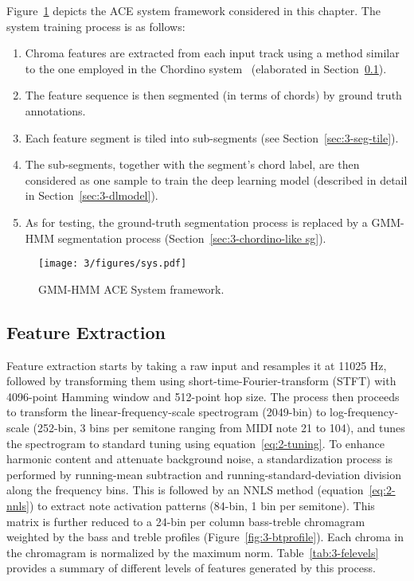 Figure~\ref{fig:3-sysover} depicts the ACE system framework considered in this chapter. The system training process is as follows:
\begin{enumerate}
\item Chroma features are extracted from each input track using a method similar to the one employed in the Chordino system~\cite{mauch2010automatic,cannam2010sonic} (elaborated in Section~\ref{sec:3-chordino-like fe}).
\item The feature sequence is then segmented (in terms of chords) by ground truth annotations.
\item Each feature segment is tiled into sub-segments (see Section~\ref{sec:3-seg-tile}).
\item The sub-segments, together with the segment's chord label, are then considered as one sample to train the deep learning model (described in detail in Section~\ref{sec:3-dlmodel}).
\item As for testing, the ground-truth segmentation process is replaced by a GMM-HMM segmentation process (Section~\ref{sec:3-chordino-like sg}).
\end{enumerate}


\begin{figure}
\centering
\texttt{[image: 3/figures/sys.pdf]}
\caption{GMM-HMM ACE System framework.}
\label{fig:3-sysover}
\end{figure}

\subsection{Feature Extraction} \label{sec:3-chordino-like fe}
Feature extraction starts by taking a raw input and resamples it at 11025 Hz, followed by transforming them using short-time-Fourier-transform (STFT) with 4096-point Hamming window and 512-point hop size. The process then proceeds to transform the linear-frequency-scale spectrogram (2049-bin) to log-frequency-scale (252-bin, 3 bins per semitone ranging from MIDI note 21 to 104), and tunes the spectrogram to standard tuning using equation~\ref{eq:2-tuning}. To enhance harmonic content and attenuate background noise, a standardization process is performed by running-mean subtraction and running-standard-deviation division along the frequency bins. This is followed by an NNLS method \cite{mauch2010approximate} (equation~\ref{eq:2-nnls}) to extract note activation patterns (84-bin, 1 bin per semitone). This matrix is further reduced to a 24-bin per column bass-treble chromagram weighted by the bass and treble profiles (Figure~\ref{fig:3-btprofile}). Each chroma in the chromagram is normalized by the maximum norm. Table~\ref{tab:3-felevels} provides a summary of different levels of features generated by this process.

